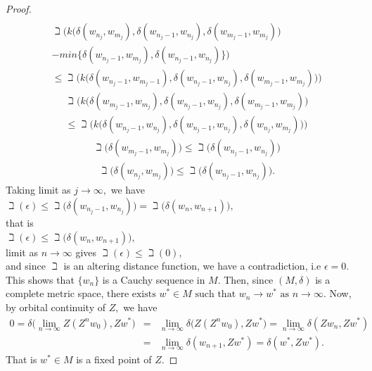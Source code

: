 \documentclass[11pt,reqno]{amsart}
\theoremstyle{definition}
\theoremstyle{remark}
\numberwithin{equation}{section}
\begin{document}
\begin{proof}
\begin{eqnarray*}
		\end{eqnarray*}
		\begin{eqnarray*}
			&\beth \Big(k\Big(\delta(w_{n_j},w_{m_j}),\delta(w_{n_j-1},w_{n_j}), \delta(w_{m_j-1},w_{m_j})\Big)\\
			&- min\{ \delta(w_{n_j-1},w_{m_j}), \delta(w_{n_j-1},w_{n_j})\}\Big)\\
			&\leq \beth\Big(k\Big(\delta(w_{n_j-1},w_{m_j-1}), \delta(w_{n_j-1},w_{n_j}), \delta(w_{m_j-1},w_{m_j})\Big)\Big)
		\end{eqnarray*}
		\begin{eqnarray*}
			&\beth \Big(k\Big(\delta(w_{m_j-1},w_{m_j}),\delta(w_{n_j-1},w_{n_j}), \delta(w_{m_j-1},w_{m_j})\Big)\\
			&\leq \beth\Big(k\Big(\delta(w_{n_j-1},w_{n_j}), \delta(w_{n_j-1},w_{n_j}), \delta(w_{n_j},w_{m_j})\Big)\Big)
		\end{eqnarray*}
		\begin{eqnarray*}
			&\beth \Big(\delta(w_{m_j-1},w_{m_j})\Big) \leq \beth\Big(\delta(w_{n_j-1},w_{n_j})\Big)
		\end{eqnarray*}
		\begin{eqnarray*}
			&\beth \Big(\delta(w_{n_j},w_{m_j})\Big) \leq \beth\Big(\delta(w_{n_j-1},w_{n_j})\Big).
		\end{eqnarray*}
		Taking limit as $j \rightarrow \infty,$ we have \\		
		$\beth (\epsilon) \leq \beth\Big(\delta(w_{n_j-1},w_{n_j})\Big) = \beth\Big(\delta(w_{n},w_{n+1})\Big),$\\
		that is\\
		$\beth (\epsilon) \leq \beth\Big(\delta(w_{n},w_{n+1})\Big),$\\
		limit as $n \to \infty$ gives
		$\beth (\epsilon) \leq \beth(0),$\\
		and since $\beth$ is an altering distance function, we have a contradiction, i.e $\epsilon =0.$\\
		This shows that $\{w_{n}\}$ is a Cauchy sequence in $M$. Then, since $(M, \delta)$ is a complete metric space, $\text{there exists }%
		w^* \in M \text{ such that }w_{n}\rightarrow w^{\ast }\text{ as }%
		n\rightarrow \infty $.\newline
		Now, by orbital continuity of $Z,$ we have\\
		\begin{eqnarray*}
		0=\delta\Big(\lim_{n \to \infty}Z(Z^nw_0),Zw^*\Big)&=&\lim_{n \to \infty} \delta\Big(Z(Z^nw_0),Zw^*\Big)= \lim_{n \to \infty} \delta(Zw_n,Zw^*)\\
		&=& \lim_{n \to \infty} \delta(w_{n+1},Zw^*)= \delta(w^*,Zw^*).
		\end{eqnarray*}
		That is $w^* \in M$ is a fixed point of $Z.$		
		\end{proof}
		
\end{document}

